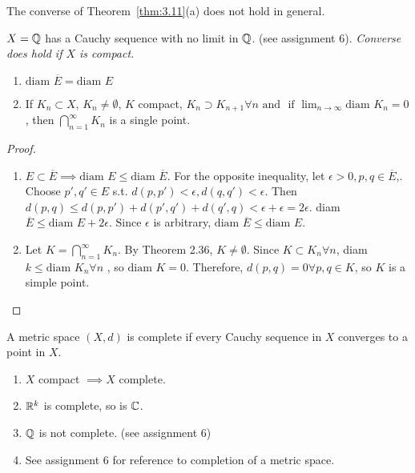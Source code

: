 \begin{note}
	The converse of Theorem~\ref{thm:3.11}(a) does not hold in general.
	\begin{example}
		$X=\mathbb{Q}$ has a Cauchy sequence with no limit in $\mathbb{Q}$. (see assignment 6).
		\textit{Converse does hold if $X$ is compact.}
	\end{example}
\end{note}

\begin{theorem}
	\begin{enumerate}
		\item $\text{diam }\overline{E} = \text{diam } E$
		\item If $K_{n} \subset X$, $K_{n} \neq \emptyset$, $K$ compact, $K_{n} \supset K_{n+1} \forall n \text{ and } \text{ if } \lim_{n\to \infty }{\text{diam }K_n}=0$, then $\bigcap_{n=1}^{\infty }K_{n} $ is a single point.
	\end{enumerate}
	\hfill
	\begin{proof}
		\begin{enumerate}
			\item
			      $E \subset \overline{E} \implies \text{diam }E \le \text{diam }\overline{E}$. For the opposite inequality, let $\epsilon>0, p,q \in \overline{E}$,. Choose $p',q' \in E$ s.t. $d(p,p') < \epsilon, d(q,q')<\epsilon$. Then $d(p,q)\le d(p,p')+d(p',q')+d(q',q)<\epsilon+\epsilon=2 \epsilon$. diam $\overline{E} \le \text{diam }E+2 \epsilon $. Since $\epsilon$ is arbitrary, $\text{diam }\overline{E}\le \text{diam }E$.

			\item
			      Let $K=\bigcap_{n=1}^{\infty} K_{n}$.
			      By Theorem 2.36, $K\neq \emptyset$. Since $K \subset K_{n} \forall n$, diam $k \le \text{diam } K_{n} \forall n$ , so $\text{diam }K=0$.
			      Therefore, $d(p,q)=0 \forall {p,q \in K}$, so $K$ is a simple point.
		\end{enumerate}
	\end{proof}

\end{theorem}

\begin{definition}
	A metric space $(X,d)$ is complete if every Cauchy sequence in $X$ converges to a point in $X$.
\end{definition}

\begin{example}
	\begin{enumerate}
		\item $X$ compact $\implies X$ complete.
		\item $\mathbb{R}^{k}$ is complete, so is $\mathbb{C}$.
		\item $\mathbb{Q}$ is not complete. (see assignment 6)
		\item See assignment 6 for reference to completion of a metric space.
	\end{enumerate}
\end{example}

